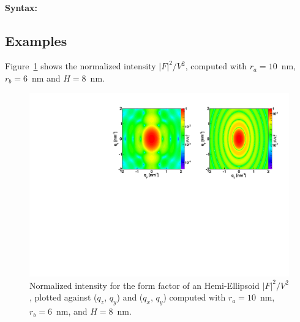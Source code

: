 \paragraph{Syntax:} 

\newpage

\subsection{Examples}
Figure~\ref{fig:FFhemiellipsEx} shows the normalized intensity
$|F|^2/V^2$, computed with $r_a=10$~nm, $r_b=6$~nm and $H=8$~nm.

\begin{figure}[h]
\begin{center}
\includegraphics[width=\textwidth]{Figures/figffhemiellips}
\end{center}
\caption{Normalized intensity for the form factor of an Hemi-Ellipsoid
  $|F|^2/V^2$, plotted against ($q_z$, $q_y$) and  ($q_x$, $q_y$)
  computed with $r_a=10$~nm, $r_b=6$~nm, and $H=8$~nm.}
\label{fig:FFhemiellipsEx}
\end{figure}
\FloatBarrier


\newpage{\cleardoublepage}
